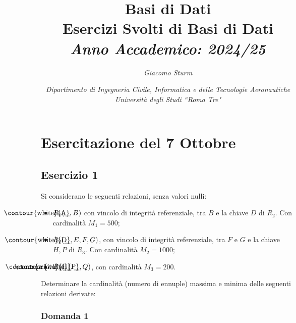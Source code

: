 \documentclass{article}
\numberwithin{equation}{subsection}
\newcommand{\myuline}[1]{%
  \uline{\phantom{#1}}%
  \llap{\contour{white}{#1}}%
}
\begin{document}
\title{%
    \textbf{Basi di Dati}  \\ 
    \large Esercizi Svolti di Basi di Dati \\
    \textit{Anno Accademico: 2024/25}}
\author{\textit{Giacomo Sturm}}
\date{\textit{Dipartimento di Ingegneria Civile, Informatica e delle Tecnologie Aeronautiche \\
Università degli Studi ``Roma Tre"}}

\maketitle
\thispagestyle{link}

\clearpage


\pagestyle{fancy}
\fancyhead{}\fancyfoot{}
\fancyfoot[C]{\thepage}

\tableofcontents

\clearpage
{}


\section{Esercitazione del 7 Ottobre}

\subsection{Esercizio 1}

Si considerano le seguenti relazioni, senza valori nulli:
\begin{itemize}
    \item $R_1(\myuline{A},B)$ con vincolo di integrità referenziale, tra $B$ e la chiave $D$ di $R_2$. Con cardinalità $M_1=500$;
    \item $R_2(\myuline{D},E,F,G)$, con vincolo di integrità referenziale, tra $F$ e $G$ e la chiave $H,P$ di $R_3$. Con cardinalità $M_2=1000$;
    \item $R_3(\myuline{H},\myuline{P},Q)$, con cardinalità $M_3=200$.
\end{itemize}

Determinare la cardinalità (numero di ennuple) massima e minima delle seguenti relazioni derivate:

\subsubsection*{Domanda 1}
\end{document}
